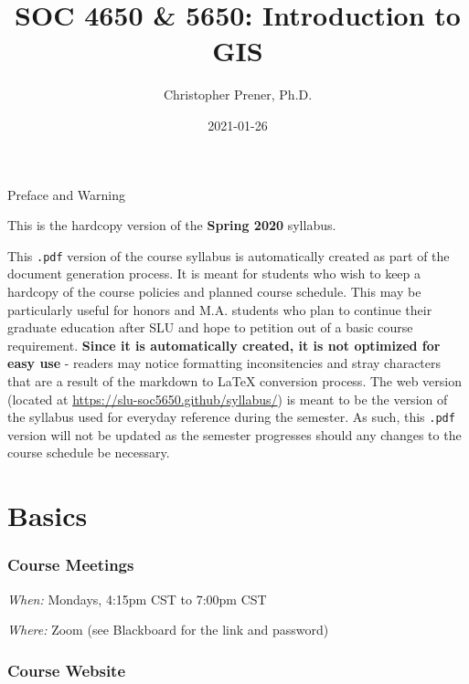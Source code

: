 \documentclass[
]{book}
\title{SOC 4650 \& 5650: Introduction to GIS}
\author{Christopher Prener, Ph.D.}
\date{2021-01-26}
\begin{document}
\maketitle

\begin{center}
{\huge Preface and Warning} \\
\end{center}
\vspace{5mm}
This is the hardcopy version of the \textbf{Spring 2020} syllabus.
\vspace{5mm}
\par \noindent This \texttt{.pdf} version of the course syllabus is automatically created as part of the document generation process. It is meant for students who wish to keep a hardcopy of the course policies and planned course schedule. This may be particularly useful for honors and M.A. students who plan to continue their graduate education after SLU and hope to petition out of a basic course requirement. \textbf{Since it is automatically created, it is not optimized for easy use} - readers may notice formatting inconsitencies and stray characters that are a result of the markdown to \LaTeX{} conversion process. The web version (located at \href{https://slu-soc5650.github/syllabus/}{https://slu-soc5650.github/syllabus/}) is meant to be the version of the syllabus used for everyday reference during the semester. As such, this \texttt{.pdf} version will not be updated as the semester progresses should any changes to the course schedule be necessary.

\hypertarget{basics}{%
\chapter*{Basics}\label{basics}}

\hypertarget{course-meetings}{%
\subsection*{Course Meetings}\label{course-meetings}}

\emph{When:} Mondays, 4:15pm CST to 7:00pm CST

\emph{Where:} Zoom (see Blackboard for the link and password)

\hypertarget{course-website}{%
\subsection*{Course Website}\label{course-website}}
\end{document}
